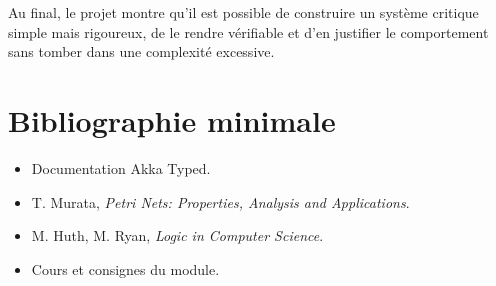 \documentclass[11pt,a4paper]{article}
\begin{document}
Au final, le projet montre qu'il est possible de construire un système critique simple mais rigoureux, de le rendre vérifiable et d'en justifier le comportement sans tomber dans une complexité excessive.

\section*{Bibliographie minimale}

\begin{itemize}
    \item Documentation Akka Typed.
    \item T. Murata, \emph{Petri Nets: Properties, Analysis and Applications}.
    \item M. Huth, M. Ryan, \emph{Logic in Computer Science}.
    \item Cours et consignes du module.
\end{itemize}
\end{document}
